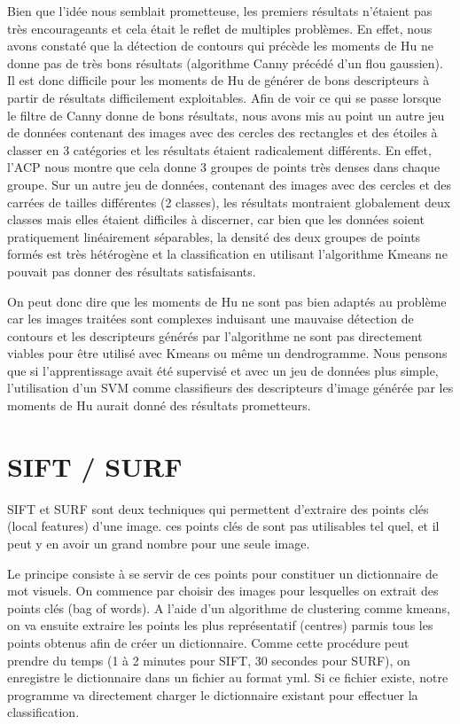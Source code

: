 \documentclass[12pt,a4paper,utf8x]{report}
\begin{document}
        Bien que l'idée nous semblait prometteuse, les premiers résultats n'étaient pas très encourageants et cela était le reflet de multiples problèmes. En effet, nous avons constaté que la détection de contours qui précède les moments de Hu ne donne pas de très bons résultats (algorithme Canny précédé d'un flou gaussien). Il est donc difficile pour les moments de Hu de générer de bons descripteurs à partir de résultats difficilement exploitables. Afin de voir ce qui se passe lorsque le filtre de Canny donne de bons résultats, nous avons mis au point un autre jeu de données contenant des images avec des cercles des rectangles et des étoiles à classer en 3 catégories et les résultats étaient radicalement différents. En effet, l'ACP nous montre que cela donne 3 groupes de points très denses dans chaque groupe. Sur un autre jeu de données, contenant des images avec des cercles et des carrées de tailles différentes (2 classes), les résultats montraient globalement deux classes mais elles étaient difficiles à discerner, car bien que les données soient pratiquement linéairement séparables, la densité des deux groupes de points formés est très hétérogène et la classification en utilisant l'algorithme Kmeans ne pouvait pas donner des résultats satisfaisants.

        On peut donc dire que les moments de Hu ne sont pas bien adaptés au problème car les images traitées sont complexes induisant une mauvaise détection de contours et les descripteurs générés par l'algorithme ne sont pas directement viables pour être utilisé avec Kmeans ou même un dendrogramme. Nous pensons que si l'apprentissage avait été supervisé et avec un jeu de données plus simple, l'utilisation d'un SVM comme classifieurs des descripteurs d'image générée par les moments de Hu aurait donné des résultats prometteurs.

    \section{SIFT / SURF}
        SIFT et SURF sont deux techniques qui permettent d'extraire des points clés (local features) d'une image. ces points clés de sont pas utilisables tel quel, et il peut y en avoir un grand nombre pour une seule image. 

        Le principe consiste à se servir de ces points pour constituer un dictionnaire de mot visuels. On commence par choisir des images pour lesquelles on extrait des points clés (bag of words). A l'aide d'un algorithme de clustering comme kmeans, on va ensuite extraire les points les plus représentatif (centres) parmis tous les points obtenus afin de créer un dictionnaire. Comme cette procédure peut prendre du temps (1 à 2 minutes pour SIFT, 30 secondes pour SURF), on enregistre le dictionnaire dans un fichier au format yml. Si ce fichier existe, notre programme va directement charger le dictionnaire existant pour effectuer la classification.
\end{document}
